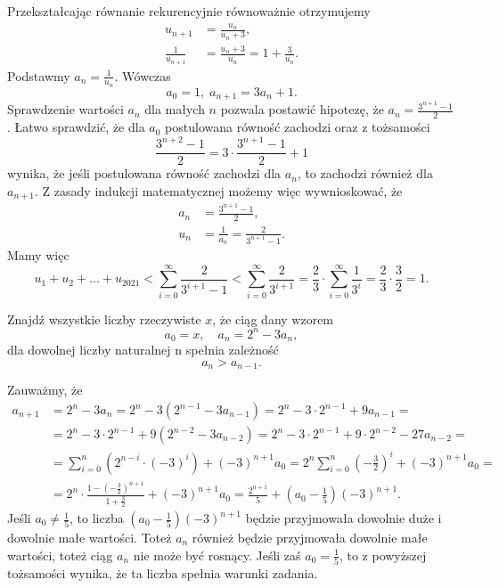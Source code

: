 \noindent
Przekształcając równanie rekurencyjnie równoważnie otrzymujemy
\begin{align*}
	u_{n + 1} &= \frac{u_n}{u_n + 3}, \\
	\frac{1}{u_{n + 1}} &= \frac{u_n + 3}{u_n} = 1 + \frac{3}{u_n}.
\end{align*}
Podstawmy $a_n = \frac{1}{u_n}$. Wówczas
\[
	a_0 = 1, \; a_{n + 1} = 3a_n + 1. 
\]
Sprawdzenie wartości $a_n$ dla małych $n$ pozwala postawić hipotezę, że $a_n = \frac{3^{n + 1} - 1}{2}$. Łatwo sprawdzić, że dla $a_0$ postulowana równość zachodzi oraz z tożsamości
\[
	\frac{3^{n + 2} - 1}{2} = 3 \cdot \frac{3^{n + 1} - 1}{2} + 1
\]
wynika, że jeśli postulowana równość zachodzi dla $a_n$, to zachodzi również dla $a_{n + 1}$. Z zasady indukcji matematycznej możemy więc wywnioskować, że
\begin{align*}
	a_{n} &= \frac{3^{n + 1} - 1}{2}, \\
	u_n &= \frac{1}{a_n} = \frac{2}{3^{n + 1} - 1}.
\end{align*}
Mamy więc
\[
	u_1 + u_2 + ... + u_{2021} < \sum^{\infty}_{i = 0} \frac{2}{3^{i + 1} - 1} < \sum^{\infty}_{i = 0} \frac{2}{3^{i + 1}} = \frac{2}{3} \cdot \sum^{\infty}_{i = 0} \frac{1}{3^{i}} = \frac{2}{3} \cdot \frac{3}{2} = 1.
\]

\begin{problem}{4}
	Znajdź wszystkie liczby rzeczywiste $x$, że ciąg dany wzorem
	\[
		a_0 = x, \quad a_n = 2^n - 3a_n,
	\]
	dla dowolnej liczby naturalnej n spełnia zależność
	\[
		a_{n} > a_{n - 1}.
	\]
\end{problem}

\noindent
Zauważmy, że
\begin{align*}
	a_{n + 1} &= 2^n - 3a_n = 2^n - 3(2^{n - 1} - 3a_{n - 1}) = 2^n - 3 \cdot 2^{n - 1} + 9a_{n - 1} =  \\
	&= 2^n - 3 \cdot 2^{n - 1} + 9(2^{n - 2} - 3a_{n - 2}) = 2^n - 3 \cdot 2^{n - 1} + 9 \cdot 2^{n - 2} - 27a_{n - 2} = \\
	&= \sum^{n}_{i = 0} \left(2^{n - i} \cdot (-3)^i\right) + (-3)^{n + 1}a_0 = 2^n \sum^{n}_{i = 0} \left(-\frac{3}{2}\right)^i + (-3)^{n + 1}a_0 = \\
	&= 2^n \cdot \frac{1 - \left(-\frac{3}{2}\right)^{n + 1}}{1 + \frac{3}{2}} + (-3)^{n + 1}a_0 = \frac{2^{n + 1}}{5} +\left(a_0 - \frac{1}{5}\right)(-3)^{n + 1}.
\end{align*}
Jeśli $a_0 \neq \frac{1}{5}$, to liczba $\left(a_0 - \frac{1}{5}\right)(-3)^{n + 1}$ będzie przyjmowała dowolnie duże i dowolnie małe wartości. Toteż $a_n$ również będzie przyjmowała dowolnie małe wartości, toteż ciąg $a_n$ nie może być rosnący. Jeśli zaś $a_0 = \frac{1}{5}$, to z powyższej tożsamości wynika, że ta liczba spełnia warunki zadania.

